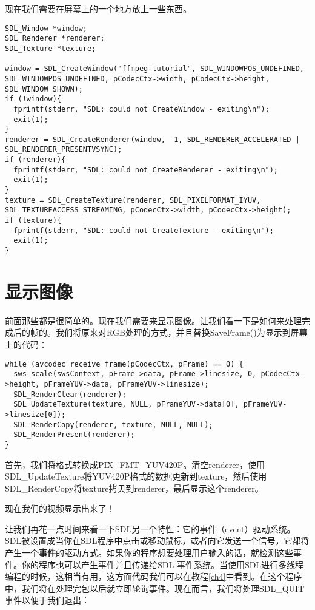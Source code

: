 现在我们需要在屏幕上的一个地方放上一些东西。

\begin{lstlisting}
SDL_Window *window;
SDL_Renderer *renderer;
SDL_Texture *texture;

window = SDL_CreateWindow("ffmpeg tutorial", SDL_WINDOWPOS_UNDEFINED, SDL_WINDOWPOS_UNDEFINED, pCodecCtx->width, pCodecCtx->height, SDL_WINDOW_SHOWN);
if (!window){
  fprintf(stderr, "SDL: could not CreateWindow - exiting\n");
  exit(1);
}
renderer = SDL_CreateRenderer(window, -1, SDL_RENDERER_ACCELERATED | SDL_RENDERER_PRESENTVSYNC);
if (renderer){
  fprintf(stderr, "SDL: could not CreateRenderer - exiting\n");
  exit(1);
}
texture = SDL_CreateTexture(renderer, SDL_PIXELFORMAT_IYUV, SDL_TEXTUREACCESS_STREAMING, pCodecCtx->width, pCodecCtx->height);
if (texture){
  fprintf(stderr, "SDL: could not CreateTexture - exiting\n");
  exit(1);
}
\end{lstlisting}

\section{显示图像}

前面那些都是很简单的。现在我们需要来显示图像。让我们看一下是如何来处理完成后的帧的。我们将原来对RGB处理的方式，并且替换SaveFrame()为显示到屏幕上的代码：

\begin{lstlisting}
while (avcodec_receive_frame(pCodecCtx, pFrame) == 0) {
  sws_scale(swsContext, pFrame->data, pFrame->linesize, 0, pCodecCtx->height, pFrameYUV->data, pFrameYUV->linesize);
  SDL_RenderClear(renderer);
  SDL_UpdateTexture(texture, NULL, pFrameYUV->data[0], pFrameYUV->linesize[0]);
  SDL_RenderCopy(renderer, texture, NULL, NULL);
  SDL_RenderPresent(renderer);
}
\end{lstlisting}

首先，我们将格式转换成PIX_FMT_YUV420P。清空renderer，使用SDL_UpdateTexture将YUV420P格式的数据更新到texture，然后使用SDL_RenderCopy将texture拷贝到renderer，最后显示这个renderer。

现在我们的视频显示出来了！

让我们再花一点时间来看一下SDL另一个特性：它的事件（event）驱动系统。SDL被设置成当你在SDL程序中点击或移动鼠标，或者向它发送一个信号，它都将产生一个\textbf{事件}的驱动方式。如果你的程序想要处理用户输入的话，就检测这些事件。你的程序也可以产生事件并且传递给SDL 事件系统。当使用SDL进行多线程编程的时候，这相当有用，这方面代码我们可以在教程\ref{ch4}中看到。在这个程序中，我们将在处理完包以后就立即轮询事件。现在而言，我们将处理SDL_QUIT事件以便于我们退出：

